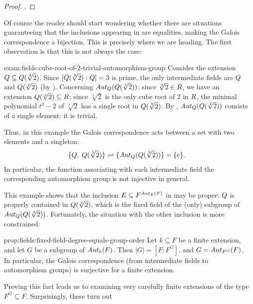 \begin{proof}
  .
\end{proof}
Of course the reader should start wondering whether there are
situations guaranteeing that the inclusions appearing in
 are equalities, making the Galois correspondence
a bijection. This is precisely where we are heading. The first
observation is that this is not always the case:
\begin{exam}{}{exam:fields:cube-root-of-2-trivial-automorphism-group}
  Consider the extension $Q \subseteq Q(\sqrt[3]{2})$. Since
  $[Q(\sqrt[3]{2}) : Q] = 3$ is prime, the only intermediate fields
  are $Q$ and $Q(\sqrt[3]{2})$ (by
  ). Concerning $Aut_{Q}(Q(\sqrt[3]{2}))$:
  since $\sqrt[3]{2} \in R$, we have an extension
  $Q(\sqrt[3]{2}) \subseteq R$; since $\sqrt[3]{2}$ is the only cube
  root of $2$ in $R$, the minimal polynomial $t^3 - 2$ of
  $\sqrt[3]{2}$ has a single root in $Q(\sqrt[3]{2})$. By
  , $Aut_{Q}(Q(\sqrt[3]{2}))$ consists of a
  single element: it is trivial.

  Thus, in this example the Galois correspondence acts between a set
  with two elements and a singleton:
  \[
    \{Q,\; Q(\sqrt[3]{2})\} \rightleftharpoons
    \{Aut_{Q}(Q(\sqrt[3]{2}))\} = \{e\}.
  \]
  In particular, the function associating with each intermediate field
  the corresponding automorphism group is not injective in general.
\end{exam}
This example shows that the inclusion $E \subseteq F^{Aut_E(F)}$ in
 may be proper: $Q$ is properly contained in
$Q(\sqrt[3]{2})$, which is the fixed field of the (only) subgroup of
$Aut_{Q}(Q(\sqrt[3]{2}))$. Fortunately, the situation with the
other inclusion is more constrained:
\begin{prop}{}{prop:fields:fixed-field-degree-equals-group-order}
  Let $k \subseteq F$ be a finite extension, and let $G$ be a subgroup
  of $Aut_k(F)$. Then $|G| = [F : F^G]$, and $G = Aut_{F^G}(F)$.  In
  particular, the Galois correspondence (from intermediate fields to
  automorphism groups) is surjective for a finite extension.
\end{prop}
Proving this fact leads us to examining very carefully finite
extensions of the type $F^G \subseteq F$. Surprisingly, these turn out
